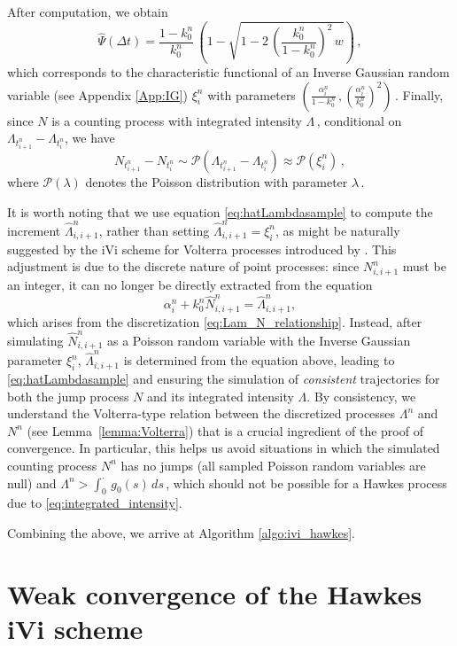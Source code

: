 \documentclass{article}
\newcommand{\1}{\mathbbm{1}}
\numberwithin{equation}{section}
\begin{document}
After computation, we obtain 
$$
\widehat \Psi(\Delta t) = \frac{1 - k_0^n}{k_0^n}\, \left(1 - \sqrt{1 - 2\,\left( \frac{k_0^n}{1 - k_0^n}\right)^2\,w} \right)\,,
$$
which corresponds to the characteristic functional of an Inverse Gaussian random variable (see Appendix \ref{App:IG}) {$\xi^n_i$} with parameters $\left( \frac{\alpha^n_i}{1 - k_0^n}\,, \left(\frac{\alpha^n_i}{k_0^n} \right)^2\right)\,$.
Finally, since $N$ is a counting process with integrated intensity $\Lambda\,$, conditional on $\Lambda_{t^n_{i+1}}- \Lambda_{t^n_i}$, we have
$$
N_{t^n_{i+1}} - N_{t^n_i} \sim \mathcal P \left(\Lambda_{t^n_{i+1}}- \Lambda_{t^n_i}\right) {\approx \mathcal P \left(\xi^n_i\right) }\,,
$$
where $\mathcal P(\lambda)$ denotes the Poisson distribution with parameter $\lambda\,$. 

It is worth noting that we use equation \eqref{eq:hatLambdasample} to compute the increment $\widehat\Lambda^n_{i,i+1}$, rather than setting $\widehat\Lambda^n_{i,i+1} = \xi_{i}^n$, as might be naturally suggested by the iVi scheme for Volterra processes introduced by \citet{jaber2025simulating}. This adjustment is due to the discrete nature of point processes: since $N^n_{i,i+1}$ must be an integer, it can no longer be directly extracted from the equation
\[
\alpha^n_i + k_0^n \widehat N^n_{i,i+1}  = \widehat \Lambda^n_{i,i+1},
\]
which arises from the discretization \eqref{eq:Lam_N_relationship}. Instead, after simulating $\widehat N^n_{i,i+1}$ as a Poisson random variable with the Inverse Gaussian parameter $\xi_{i}^n$, $\widehat\Lambda^n_{i,i+1}$ is determined from the equation above, leading to \eqref{eq:hatLambdasample} and ensuring the simulation of \emph{consistent} trajectories for both the jump process $N$ and its integrated intensity $\Lambda$. 
By consistency, we understand the Volterra-type relation between the discretized processes $\Lambda^n$ and $N^n$ (see Lemma~\ref{lemma:Volterra}) that is a crucial ingredient of the proof of convergence. In particular, this helps us avoid situations in which the simulated counting process $N^n$ has no jumps (all sampled Poisson random variables are null) and $\Lambda^n > \int_0^{\cdot}\,g_0(s)\,ds\,$, which should not be possible for a Hawkes process due to \eqref{eq:integrated_intensity}.

Combining the above, we arrive at Algorithm \ref{algo:ivi_hawkes}.


\section{Weak convergence of the Hawkes iVi scheme}
\end{document}
